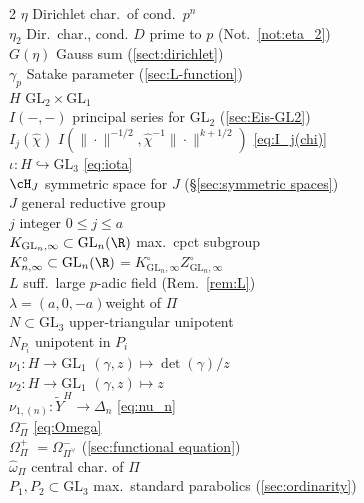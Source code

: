 \documentclass[10pt,reqno,a4paper]{amsart}
\newcommand{\chihat}{\widehat{\chi}}
\newcommand{\omegahat}{\widehat{\omega}}
\newcommand{\GL}{\mathrm{GL}}
\begin{document}
\begin{multicols}{2}
	$\eta$ \dotfill Dirichlet char.\ of cond.\ $p^n$\\
	$\eta_2$ \dotfill  Dir.\ char., cond. $D$ prime to $p$ (Not.\ \ref{not:eta_2})\\
	$G(\eta)$ \dotfill Gauss sum (\cref{sect:dirichlet})\\
	$\gamma_p$  \dotfill Satake parameter (\cref{sec:L-function})\\
	$H$ \dotfill $\GL_2 \times \GL_1$\\
	$I(-,-)$ \dotfill principal series for $\GL_2$ (\cref{sec:Eis-GL2})\\
	$I_j(\chihat)$ \dotfill $I(\|\cdot\|^{-1/2}, \chihat^{-1}\|\cdot\|^{k+1/2})$ \eqref{eq:I_j(chi)}\\
	$\iota : H \hookrightarrow \GL_3$ \dotfill \eqref{eq:iota}\\
	$\cH_J$ \dotfill symmetric space for $J$ (\S\ref{sec:symmetric spaces})\\
	$J$ \dotfill general reductive group\\
	$j$ \dotfill integer $0 \leq j \leq a$ \\
	$K_{\GL_n,\infty} \subset \GL_n(\R)$ \dotfill max.\ cpct subgroup\\
	$K_{n,\infty}^\circ \subset \GL_n(\R)$\dotfill $= K_{\GL_n,\infty}^\circ Z_{\GL_n,\infty}^\circ$\\
	$L$ \dotfill suff.\ large $p$-adic field (Rem.\ \ref{rem:L})\\
	$\lambda = (a,0,-a)$\dotfill weight of $\Pi$\\
	$N \subset \GL_3$ \dotfill upper-triangular unipotent\\
	$N_{P_i}$ \dotfill unipotent in $P_i$\\
	$\nu_1 : H \to \GL_1$ \dotfill $(\gamma,z) \mapsto \det(\gamma)/z$\\
	$\nu_2 : H \to \GL_1$ \dotfill $(\gamma,z) \mapsto z$\\
	$\nu_{1,(n)} : \widetilde{Y}^H \to \Delta_n$ \dotfill \eqref{eq:nu_n}\\
	$\Omega_\Pi^-$ \dotfill \eqref{eq:Omega}\\
	$\Omega_\Pi^+$ \dotfill $= \Omega_{\Pi^\vee}^-$ (\cref{sec:functional equation}) \\
	$\omegahat_\Pi$ \dotfill central char. of $\Pi$\\
	$P_1,P_2 \subset \GL_3$ \dotfill max.\ standard parabolics (\cref{sec:ordinarity})\\

\end{multicols}
\end{document}
